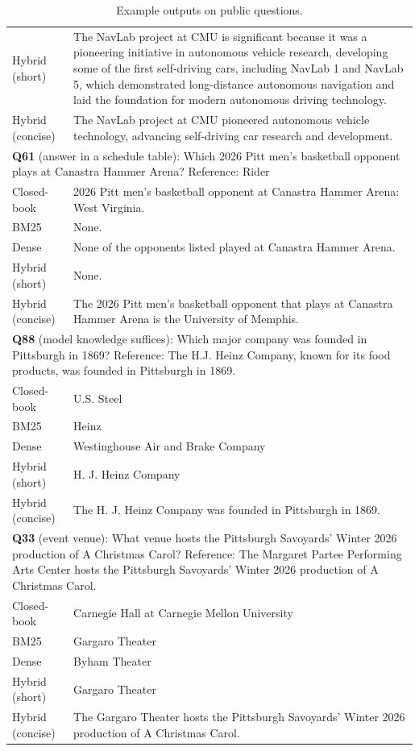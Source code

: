 \begin{table}[t]
\begin{tabular}{lp{}}
Hybrid (short) & The NavLab project at CMU is significant because it was a pioneering initiative in autonomous vehicle research, developing some of the first self-driving cars, including NavLab 1 and NavLab 5, which demonstrated long-distance autonomous navigation and laid the foundation for modern autonomous driving technology. \\
Hybrid (concise) & The NavLab project at CMU pioneered autonomous vehicle technology, advancing self-driving car research and development. \\
\midrule
\multicolumn{2}{p{0.95\textwidth}}{\textbf{Q61} (answer in a schedule table): Which 2026 Pitt men's basketball opponent plays at Canastra Hammer Arena? Reference: Rider} \\
Closed-book & 2026 Pitt men's basketball opponent at Canastra Hammer Arena: West Virginia. \\
BM25 & None. \\
Dense & None of the opponents listed played at Canastra Hammer Arena. \\
Hybrid (short) & None. \\
Hybrid (concise) & The 2026 Pitt men's basketball opponent that plays at Canastra Hammer Arena is the University of Memphis. \\
\midrule
\multicolumn{2}{p{0.95\textwidth}}{\textbf{Q88} (model knowledge suffices): Which major company was founded in Pittsburgh in 1869? Reference: The H.J. Heinz Company, known for its food products, was founded in Pittsburgh in 1869.} \\
Closed-book & U.S. Steel \\
BM25 & Heinz \\
Dense & Westinghouse Air and Brake Company \\
Hybrid (short) & H. J. Heinz Company \\
Hybrid (concise) & The H. J. Heinz Company was founded in Pittsburgh in 1869. \\
\midrule
\multicolumn{2}{p{0.95\textwidth}}{\textbf{Q33} (event venue): What venue hosts the Pittsburgh Savoyards' Winter 2026 production of A Christmas Carol? Reference: The Margaret Partee Performing Arts Center hosts the Pittsburgh Savoyards' Winter 2026 production of A Christmas Carol.} \\
Closed-book & Carnegie Hall at Carnegie Mellon University \\
BM25 & Gargaro Theater \\
Dense & Byham Theater \\
Hybrid (short) & Gargaro Theater \\
Hybrid (concise) & The Gargaro Theater hosts the Pittsburgh Savoyards' Winter 2026 production of A Christmas Carol. \\
\bottomrule
\end{tabular}
\caption{Example outputs on public questions.}
\label{tab:examples}
\end{table}
